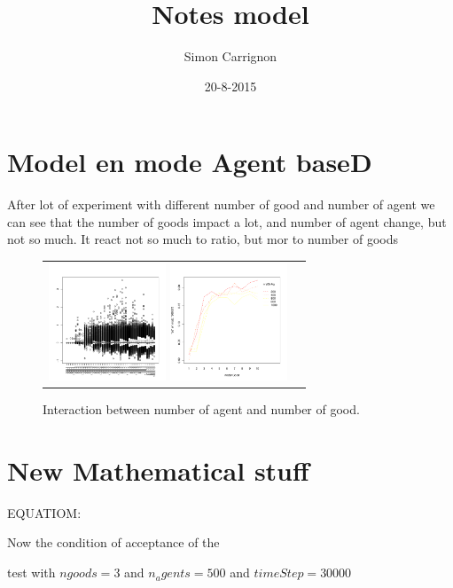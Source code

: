 \documentclass[a4paper]{article}
\title{Notes model}
\author{Simon Carrignon}
\date{20-8-2015}
\begin{document}
\section{Model en mode Agent baseD}
After lot of experiment with different number of good and number of agent we can see that the number of goods impact a lot, and number of agent change, but not so much. It react not so much to ratio, but mor to number of goods

\begin{figure}[htp]
    \centering
    \begin{tabular}{cc}
	\includegraphics[width=3.5cm]{interactionNGoodNAgent.pdf}
	\includegraphics[width=3.5cm]{interactionNGoodNAgentSD.pdf}
    \end{tabular}
    \caption{Interaction between number of agent and number of good.}
\end{figure}

\section{New Mathematical stuff}

EQUATIOM: %

Now the condition of acceptance of the 

test with $ngoods=3$ and $n_agents=500$ and $timeStep=30000$
\end{document}
